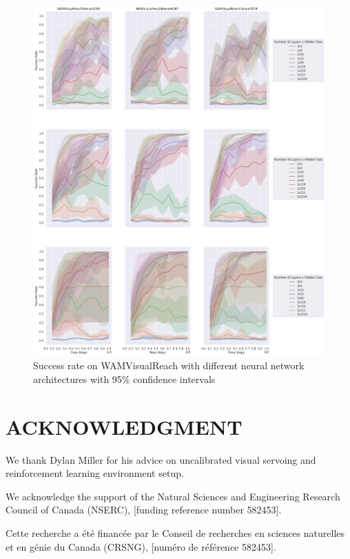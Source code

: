 \documentclass[letterpaper, 10 pt, conference]{ieeeconf}  %
\begin{document}
\begin{figure}[thpb]
    \centering
    \includegraphics[width=\linewidth]{successes.arch.timesteps.png}
    \caption{Success rate on WAMVisualReach with different neural network architectures with 95\% confidence intervals}
    \label{fig:arch}
\end{figure}

\section*{ACKNOWLEDGMENT}

We thank Dylan Miller for his advice on uncalibrated visual
servoing and reinforcement learning environment setup.

We acknowledge the support of the Natural Sciences and Engineering Research
Council of Canada (NSERC), [funding reference number 582453].

Cette recherche a été financée par le Conseil de recherches en sciences
naturelles et en génie du Canada (CRSNG), [numéro de référence 582453].



\end{document}
